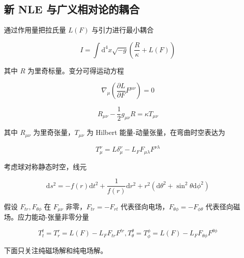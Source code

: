 \documentclass[9pt, dvipsnames]{beamer} %
\begin{document}
\subsection{新 NLE 与广义相对论的耦合}

\begin{frame}
    通过作用量把拉氏量 $L(F) $ 与引力进行最小耦合

    $$
    I
    =\int \mathrm{d}^4 x\sqrt{-g}\left(\frac{R }{\kappa } + L(F) \right) 
    $$
    
    其中 $R $ 为里奇标量。变分可得运动方程
    
    $$
    \nabla_\mu\left(\frac{\partial L }{\partial F } F^{\mu\nu} \right)
    =0
    $$
    
    $$
    R_{\mu\nu} - \frac{1 }{2 } g_{\mu\nu} R
    =\kappa T_{\mu\nu}
    $$
    
    其中 $R_{\mu\nu} $ 为里奇张量，$T_{\mu\nu} $ 为 Hilbert 能量-动量张量，在弯曲时空表达为
    
    $$
    T_\mu^\nu
    =L\delta_\mu^\nu - L_F F_{\mu\lambda} F^{\nu \lambda}
    $$
    
    考虑球对称静态时空，线元
    
    $$
    \mathrm{d}s^2
    =-f(r)\mathrm{d}t^2 + \frac{1 }{f(r) } \mathrm{d}r^2 + r^2\left(\mathrm{d}\theta^2+\sin^2\theta\mathrm{d}\phi^2 \right)
    $$
    
    假设 $F_{tr},F_{\theta\phi} $ 在 $F_{\mu\nu} $ 非零，$F_{tr}=-F_{rt} $ 代表径向电场，$F_{\theta\phi}=-F_{\phi\theta} $ 代表径向磁场。应力能动-张量非零分量
    
    $$
    T_t^t = T_r^r
    =L(F) - L_F F_{tr}F^{tr},
    T_\theta^\theta
    =T_\phi^\phi
    =L(F) - L_F F_{\theta\phi}F^{\theta\phi}
    $$
    
    下面只关注纯磁场解和纯电场解。
\end{frame}
\end{document}
